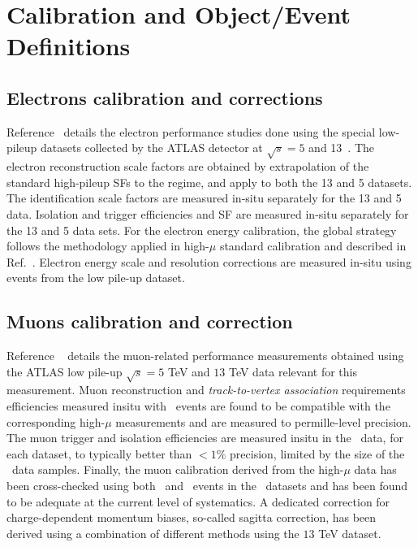 
\chapter{Calibration and Object/Event Definitions}
\label{sec:objects}



\section{Electrons calibration and corrections}
\label{sec:elCorr}

Reference~\cite{lowMuMw:INT1} details the electron performance studies done using the special low-pileup datasets collected by the ATLAS detector at $\sqrt{s} = 5$ and 13~\TeV.
The electron reconstruction scale factors are obtained by extrapolation of the standard high-pileup SFs to the \lowmu regime, and apply to both the 13 and 5 \TeV{} datasets. The identification scale factors are measured in-situ separately for the 13 and 5 \TeV{} data.
Isolation and trigger efficiencies and SF are measured in-situ separately for the 13 and 5 \TeV{} data sets.
For the electron energy calibration, the global strategy follows the methodology applied in high-$\mu$ standard calibration and described in Ref.~\cite{EGAM-2018-01}.
Electron energy scale and resolution corrections are measured in-situ using \Zee events from the low pile-up dataset. 

\section{Muons calibration and correction}\label{sec:muCorr}

Reference ~\cite{lowMuMw:INT1} details the muon-related performance measurements obtained using the ATLAS low pile-up $\sqrt{s} = 5$
TeV and $13$ TeV data relevant for this measurement.
Muon reconstruction and \textit{track-to-vertex association} requirements efficiencies measured
insitu with \Zmm\ events are found to be compatible with the
corresponding high-$\mu$ measurements and are measured to
permille-level precision. The muon trigger and isolation efficiencies
are measured insitu in the \lowmu\ data, for each dataset, to typically better than $<1\%$ precision, limited
by the size of the \Zmm\ data samples. Finally, the muon calibration
derived from the high-$\mu$ data has been cross-checked using both
\Zmm\ and \Jmumu\ events in the \lowmu\ datasets and has been found to be adequate at the
current level of systematics. A dedicated correction for
charge-dependent momentum biases, so-called sagitta correction, has
been derived using a combination of different methods using the $13$ TeV \lowmu dataset.



